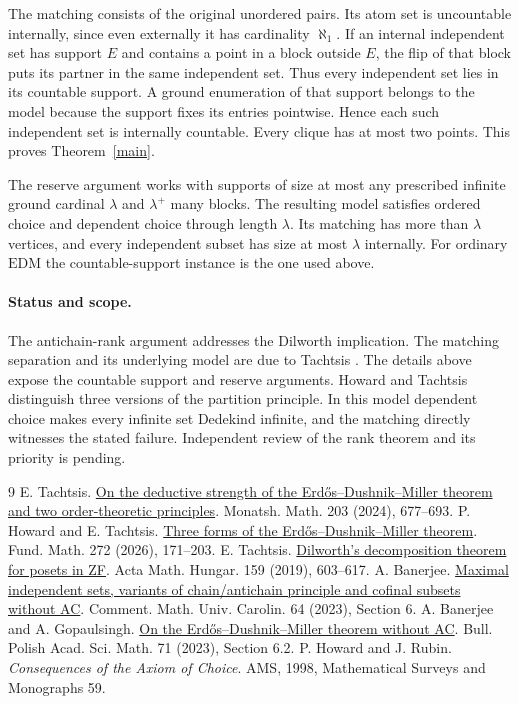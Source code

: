 \documentclass[11pt]{article}
\begin{document}
The matching consists of the original unordered pairs. Its atom set is uncountable internally, since even externally it has cardinality $\aleph_1$. If an internal independent set has support $E$ and contains a point in a block outside $E$, the flip of that block puts its partner in the same independent set. Thus every independent set lies in its countable support. A ground enumeration of that support belongs to the model because the support fixes its entries pointwise. Hence each such independent set is internally countable. Every clique has at most two points. This proves Theorem~\ref{main}.

The reserve argument works with supports of size at most any prescribed infinite ground cardinal $\lambda$ and $\lambda^+$ many blocks. The resulting model satisfies ordered choice and dependent choice through length $\lambda$. Its matching has more than $\lambda$ vertices, and every independent subset has size at most $\lambda$ internally. For ordinary $\mathrm{EDM}$ the countable-support instance is the one used above.

\paragraph{Status and scope.} The antichain-rank argument addresses the Dilworth implication. The matching separation and its underlying model are due to Tachtsis \cite{t24}. The details above expose the countable support and reserve arguments. Howard and Tachtsis \cite{ht26} distinguish three versions of the partition principle. In this model dependent choice makes every infinite set Dedekind infinite, and the matching directly witnesses the stated failure. Independent review of the rank theorem and its priority is pending.
\begin{thebibliography}{9}
 E. Tachtsis. \href{https://doi.org/10.1007/s00605-023-01933-z}{On the deductive strength of the Erdős--Dushnik--Miller theorem and two order-theoretic principles}. Monatsh. Math. 203 (2024), 677--693.
 P. Howard and E. Tachtsis. \href{https://doi.org/10.4064/fm250514-20-7}{Three forms of the Erdős--Dushnik--Miller theorem}. Fund. Math. 272 (2026), 171--203.
 E. Tachtsis. \href{https://doi.org/10.1007/s10474-019-00967-w}{Dilworth's decomposition theorem for posets in ZF}. Acta Math. Hungar. 159 (2019), 603--617.
 A. Banerjee. \href{https://dml.cz/handle/10338.dmlcz/151857}{Maximal independent sets, variants of chain/antichain principle and cofinal subsets without AC}. Comment. Math. Univ. Carolin. 64 (2023), Section 6.
 A. Banerjee and A. Gopaulsingh. \href{https://doi.org/10.4064/ba221221-6-6}{On the Erdős--Dushnik--Miller theorem without AC}. Bull. Polish Acad. Sci. Math. 71 (2023), Section 6.2.
 P. Howard and J. Rubin. \emph{Consequences of the Axiom of Choice}. AMS, 1998, Mathematical Surveys and Monographs 59.
\end{thebibliography}
\end{document}
